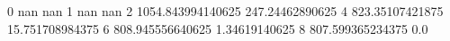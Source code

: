 0 nan nan
1 nan nan
2 1054.843994140625 247.24462890625
4 823.35107421875 15.751708984375
6 808.945556640625 1.34619140625
8 807.599365234375 0.0

